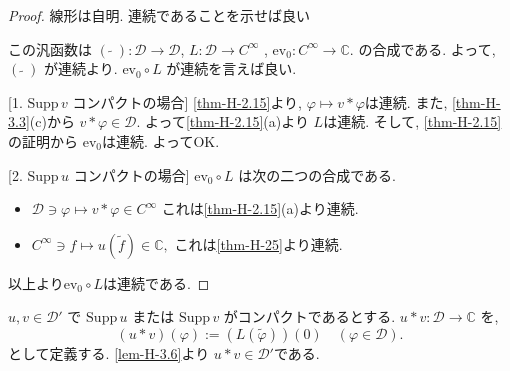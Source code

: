 \begin{proof}
線形は自明. 連続であることを示せば良い

この汎函数は
 \((\,\widetilde{\,}\,): \mathcal{D} \to \mathcal{D}\),
\(L: \mathcal{D} \to C^\infty\) , \(\mathrm{ev}_0 : C^\infty \to \mathbb{C}.\)
の合成である.
よって,  \((\,\widetilde{\,}\,)\) が連続より.
 \(\mathrm{ev}_0 \circ L\) が連続を言えば良い.
 
 [1. \(\mathrm{Supp}\, v\) コンパクトの場合]
\ref{thm-H-2.15}より, \(\varphi \mapsto v \ast \varphi\)は連続. 
また, \ref{thm-H-3.3}(c)から
 $v \ast \varphi  \in \mathcal{D}$. 
よって\ref{thm-H-2.15}(a)より \(L \)は連続. 
そして, \ref{thm-H-2.15}の証明から \(\mathrm{ev}_0 \)は連続. よってOK.

 [2. \(\mathrm{Supp}\, u\) コンパクトの場合]
\(\mathrm{ev}_0 \circ L\) は次の二つの合成である.
\begin{itemize}
\item
\(\mathcal{D} \ni \varphi \mapsto v \ast \varphi \in C^\infty \)
これは\ref{thm-H-2.15}(a)より連続. 
\item\(
C^\infty \ni f \mapsto u(\widetilde{f}) \in \mathbb{C},\) これは\ref{thm-H-25}より連続. 
\end{itemize}
以上より\(\mathrm{ev}_0 \circ L\)は連続である. 
\end{proof}

\begin{tcolorbox}[mybox]
\begin{defn}\cite[Definition 6.36]{Rud}
\label{defn-H-3.7}
\( u, v \in \mathcal{D}' \) で
\(\mathrm{Supp}\, u\) または \(\mathrm{Supp}\, v\) がコンパクトであるとする. 
\( u \ast v : \mathcal{D} \to \mathbb{C} \) を, 
\[
(u \ast v)(\varphi) := (L(\widetilde{\varphi}))(0) \quad (\varphi \in \mathcal{D}).
\]
として定義する. 
\ref{lem-H-3.6}より \( u \ast v \in \mathcal{D}'\)である. 
\end{defn}
\end{tcolorbox}

